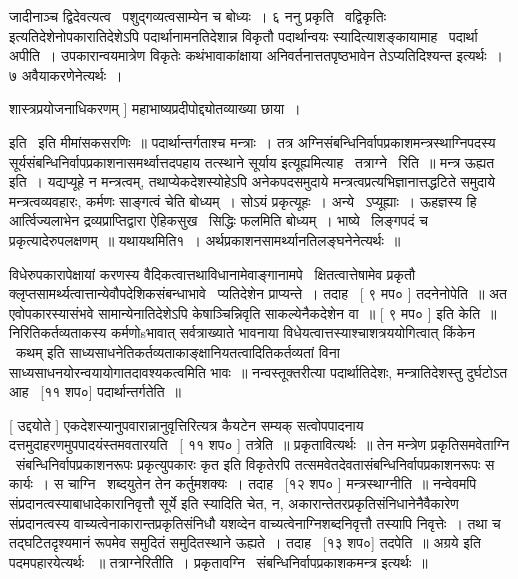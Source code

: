 \documentclass[11pt, openany]{book}
\begin{document}
जादीनाञ्च द्विदेवत्यत्व \textendash\ पशुद्गव्यत्वसाम्येन च बोध्यः~। ६ ननु {\qt प्रकृति \textendash\ 
वद्विकृतिः \textendash\ } इत्यतिदेशेनोपकारातिदेशेऽपि पदार्थानामनतिदेशान्न विकृतौ
पदार्थान्वयः स्यादित्याशङ्कायामाह \textendash\ पदार्था अपीति~। उपकारान्वयमात्रेण
विकृतेः कथंभावाकांक्षाया अनिवर्तनात्ततपृष्ठभावेन तेऽप्यतिदिश्यन्त
इत्यर्थः~। ७ अवैयाकरणेनेत्यर्थः~। 

शास्त्रप्रयोजनाधिकरणम् ] महाभाष्यप्रदीपोद्द्योतव्याख्या छाया~। 



इति \textendash\ इति मीमांसकसरणिः~॥ पदार्थान्तर्गताश्च मन्त्राः~। तत्र
अग्निसंबन्धिनिर्वापप्रकाशमन्त्रस्थाग्निपदस्य
सूर्यसंबन्धिनिर्वापप्रकाशनासमर्थ्वात्तदपहाय तत्स्थाने
{\qt सूर्याय} इत्यूह्यमित्याह \textendash\ तत्राग्ने \textendash\ रिति~॥ मन्त्र ऊह्यत इति~। 
यद्यप्यूहे न मन्त्रत्वम्, तथाप्येकदेशस्योहेऽपि अनेकपदसमुदाये
मन्त्रत्वप्रत्यभिज्ञानात्तद्धटिते समुदाये मन्त्रत्वव्यवहारः, कर्मणः
साङ्गत्वं चेति बोध्यम्~। सोऽयं प्रकृत्यूहः~। अन्ये \textendash\ ऽप्यूह्याः~। ऊहज्ञस्य
हि आर्त्विज्यलाभेन द्रव्यप्राप्तिद्वारा ऐहिकसुख \textendash\ सिद्धिः फलमिति बोध्यम्~। 
भाष्ये \textendash\ लिङ्गपदं च प्रकृत्यादेरुपलक्षणम्~॥ यथायथमिति१~। 
अर्थप्रकाशनसामर्थ्यानतिलङ्घनेनेत्यर्थः~॥ 



विधेरुपकारापेक्षायां करणस्य वैदिकत्वात्तथाविधानामेवाङ्गानामपे \textendash\ 
क्षितत्वात्तेषामेव प्रकृतौ
क्लृप्तसामर्थ्यत्वात्तान्येवौपदेशिकसंबन्धाभावे \textendash\ प्यतिदेशेन प्राप्यन्ते~। 
तदाह \textendash\ [ ९ मप० ] तदनेनोपेति~॥ अत एवोपकारस्यासंभवे
सामान्येनातिदेशेऽपि केषाञ्चिन्निवृति साकल्येनैकदेशेन वा~॥ [ ९
मप० ] इति केति~॥ निरितिकर्तव्यताकस्य कर्मणोsभावात् सर्वत्राख्याते
भावनाया विधेयत्वात्तस्याश्चाशत्रययोगित्वात् {\qt किंकेन} \textendash\ कथम् इति
साध्यसाधनेतिकर्तव्यताकाङ्क्षानियतत्वादितिकर्तव्यतां विना
साध्यसाधनयोरन्वयायोगातदावश्यकत्वमिति भावः~॥ नन्वस्तूक्तरीत्या
पदार्थातिदेशः, मन्त्रातिदेशस्तु दुर्घटोऽत आह \textendash\ [११ शप०]
पदार्थान्तर्गतेति~॥ 

 [ उद्दयोते ] एकदेशस्यानुपवारान्नानुवृत्तिरित्यत्र कैयटेन सम्यक्
सत्वोपपादनाय दत्तमुदाहरणमुपपादयंस्तमवतारयति \textendash\ [ ११ शप० ] तत्रेति~॥
प्रकृतावित्यर्थः~॥ तेन मन्त्रेण प्रकृतिसमवेताग्नि \textendash\ 
संबन्धिनिर्वापप्रकाशनरूपः प्रकृत्युपकारः कृत इति विकृतेरपि
तत्समवेतदेवतासंबन्धिनिर्वापप्रकाशनरूपः स कार्यः~। स चाग्नि \textendash\ शब्दयुतेन
तेन कर्तुमशक्यः~। तदाह \textendash\ [१२ शप० ] मन्त्रस्थाग्नीति~॥ नन्वेवमपि
संप्रदानत्वस्याबाधादेकारानिवृत्तौ सूर्ये इति स्यादिति चेत, न,
अकारान्तेतरप्रकृतिसंनिधानेनैवैकारेण संप्रदानत्वस्य
वाच्यत्वेनाकारान्तप्रकृतिसंनिधौ यशव्देन वाच्यत्वेनाग्निशब्दनिवृत्तौ
तस्यापि निवृत्तेः~। तथा च तद्घटितदृश्यमानं रूपमेव समुदितं समुदितस्थाने
ऊह्यते~। तदाह \textendash\ [१३ शप०] तदपेति~॥ {\qt अग्रये} इति पदमपहारयेत्यर्थः
~॥ तत्राग्नेरितीति~। प्रकृतावग्नि \textendash\ संबन्धिनिर्वापप्रकाशकमन्त्र
इत्यर्थः~॥ 
\end{document}
